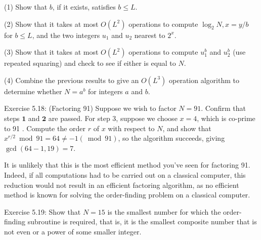 (1) Show that $b$, if it exists, satisfies $b \leq L$.

(2) Show that it takes at most $O\left(L^{2}\right)$ operations to compute $\log _{2} N, x=y / b$ for $b \leq L$, and the two integers $u_{1}$ and $u_{2}$ nearest to $2^{x}$.

(3) Show that it takes at most $O\left(L^{2}\right)$ operations to compute $u_{1}^{b}$ and $u_{2}^{b}$ (use repeated squaring) and check to see if either is equal to $N$.

(4) Combine the previous results to give an $O\left(L^{3}\right)$ operation algorithm to determine whether $N=a^{b}$ for integers $a$ and $b$.

Exercise 5.18: (Factoring 91) Suppose we wish to factor $N=91$. Confirm that steps $\mathbf{1}$ and $\mathbf{2}$ are passed. For step 3, suppose we choose $x=4$, which is co-prime to 91 . Compute the order $r$ of $x$ with respect to $N$, and show that $x^{r / 2} \bmod 91=64 \neq-1(\bmod 91)$, so the algorithm succeeds, giving $\operatorname{gcd}(64-1,19)=7$.

It is unlikely that this is the most efficient method you've seen for factoring 91. Indeed, if all computations had to be carried out on a classical computer, this reduction would not result in an efficient factoring algorithm, as no efficient method is known for solving the order-finding problem on a classical computer.

Exercise 5.19: Show that $N=15$ is the smallest number for which the order-finding subroutine is required, that is, it is the smallest composite number that is not even or a power of some smaller integer.